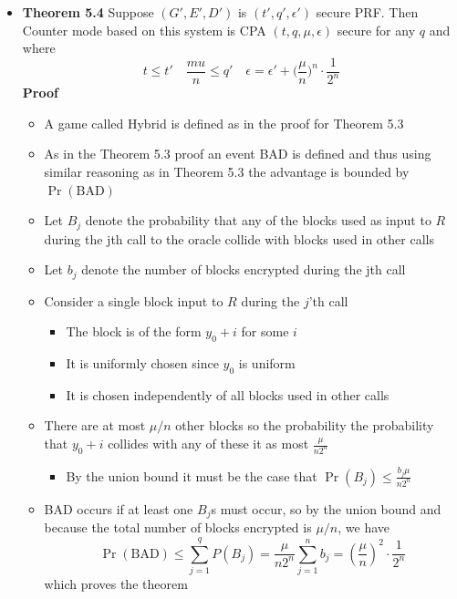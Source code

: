 \begin{itemize}
  \item \textbf{Theorem 5.4} Suppose $(G',E',D')$ is $(t',q',\epsilon')$ secure PRF. Then Counter mode based on this system is CPA $(t,q,\mu,\epsilon)$ secure for any $q$ and where
  \begin{equation*}
    t \leq t' \quad \frac{mu}{n} \leq q' \quad \epsilon = \epsilon' + \bigg(\frac{\mu}{n}\bigg)^n \cdot \frac1{2^n}
  \end{equation*}
  \textbf{Proof}
  \begin{itemize}
  	\item A game called Hybrid is defined as in the proof for Theorem 5.3
    \item As in the Theorem 5.3 proof an event BAD is defined and thus using similar reasoning as in Theorem 5.3 the advantage is bounded by $\Pr(\text{BAD})$
    \item Let $B_j$ denote the probability that any of the blocks used as input to $R$ during the jth call to the oracle collide with blocks used in other calls
    \item Let $b_j$ denote the number of blocks encrypted during the jth call 
    \item Consider a single block input to $R$ during the $j$'th call
    \begin{itemize}
    	\item The block is of the form $y_0 + i$ for some $i$ 
      \item It is uniformly chosen since $y_0$ is uniform
      \item It is chosen independently of all blocks used in other calls
    \end{itemize}
    \item There are at most $\mu / n$ other blocks so the probability the probability that $y_0 + i$ collides with any of these it as most $\frac{\mu}{n2^n}$
    \begin{itemize}
    	\item By the union bound it must be the case that $\Pr(B_j) \leq \frac{b_j \mu}{n 2^n}$
    \end{itemize}
    \item BAD occurs if at least one $B_j$s must occur, so by the union bound and because the total number of blocks encrypted is $\mu/n$, we have
    \[
      \Pr(\text{BAD}) \leq \sum_{j=1}^q P(B_j) = \frac{\mu}{n2^n} \sum_{j=1}^n b_j = \left(\frac{\mu}{n}\right)^2 \cdot \frac1{2^n}
    \]
  which proves the theorem
  \end{itemize}
\end{itemize}

\newpage


